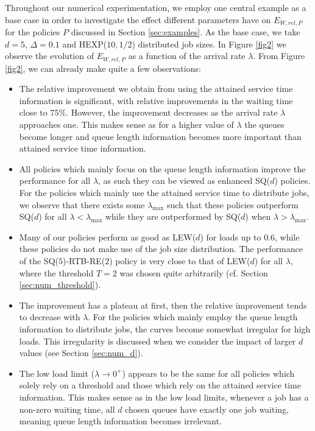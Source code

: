 \documentclass[12pt]{report}
\begin{document}
Throughout our numerical experimentation, we employ one central example as a base case in order to investigate the effect different parameters have on $E_{W, rel, P}$ for the policies $P$ discussed in Section \ref{sec:examples}. As the base case, we take $d=5$, $\Delta=0.1$ and HEXP($10,1/2$) distributed job sizes. In Figure \ref{fig2} we observe the evolution of $E_{W, rel, P}$ as a function of the arrival rate $\lambda$. From  Figure \ref{fig2}, we can already make quite a few observations:
\begin{itemize}
\item The relative improvement we obtain from using the attained service time information is significant, with relative improvements in the waiting time close to $75\%$. However, the improvement decreases as the arrival rate $\lambda$ approaches one. This makes sense as for a higher value of $\lambda$ the queues become longer and queue length information becomes more important than attained service time information.
\item All policies which mainly focus on the queue length information improve the performance
for all $\lambda$, as such they can be viewed as enhanced SQ($d$) policies. For the policies which mainly use the attained service time to distribute jobs, we observe that there exists some $\lambda_{\max}$ such that these policies outperform SQ($d$) for all $\lambda < \lambda_{\max}$ while they are outperformed by SQ($d$) when $\lambda > \lambda_{\max}$.  
\item Many of our policies perform as good as LEW($d$) for loads up to $0.6$, while these 
policies do not make use of the job size distribution.
The performance of the SQ($5$)-RTB-RE($2$) policy is very close to that of LEW($d$) 
for all $\lambda$, where the threshold $T=2$ was chosen quite arbitrarily (cf. Section \ref{sec:num_threshold}).
\item The improvement has a plateau at first, then the relative improvement tends to decrease with $\lambda$. For the policies which mainly employ the queue length information to distribute jobs, the curves
become somewhat irregular for high loads. This irregularity is discussed when we
consider the impact of larger $d$ values (see Section \ref{sec:num_d}).
\item The low load limit ($\lambda\rightarrow 0^+$) appears to be the same for all policies which solely rely on a threshold and those which rely on the attained service time information. This makes sense as in the low load limits, whenever a job has a non-zero waiting time, all $d$ chosen queues  have exactly one job waiting, meaning queue length information becomes irrelevant.
\end{itemize}
\end{document}
